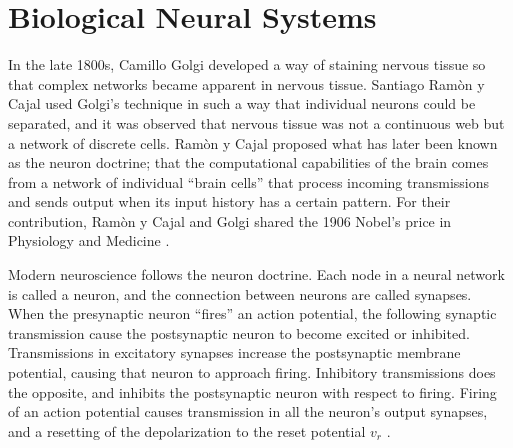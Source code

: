 



\section{Biological Neural Systems}
\label{secBiologicalNeuralSystems}	
	In the late 1800s, Camillo Golgi developed a way of staining nervous tissue so that complex networks became apparent in nervous tissue.
	Santiago Ramòn y Cajal used Golgi's technique in such a way that individual neurons could be separated, and it was observed that nervous tissue was not a continuous web but a network of discrete cells. 
	Ramòn y Cajal proposed what has later been known as the neuron doctrine; 
		that the computational capabilities of the brain comes from a network of individual ``brain cells'' that process incoming transmissions and sends output when its input history has a certain pattern.
	For their contribution, Ramòn y Cajal and Golgi shared the 1906 Nobel's price in Physiology and Medicine
	\cite{NeuroscienceExploringTheBrain3ed, PrinciplesOfNeuralScience4edKAP01}. %

	Modern neuroscience follows the neuron doctrine. 
	Each node in a neural network is called a neuron, and the connection between neurons are called synapses.
	When the presynaptic neuron ``fires'' an action potential, the following synaptic transmission cause the postsynaptic neuron to become excited or inhibited.
	Transmissions in excitatory synapses increase the postsynaptic membrane potential, causing that neuron to approach firing. %
	Inhibitory transmissions does the opposite, and inhibits the postsynaptic neuron with respect to firing.
	Firing of an action potential causes transmission in all the neuron's output synapses, and a resetting of the depolarization to the reset potential $v_r$ %
	\cite{PurvesNeuroscience, PrinciplesOfNeuralScience4edKAP01, PrinciplesOfNeuralScience4edKAP02}.


